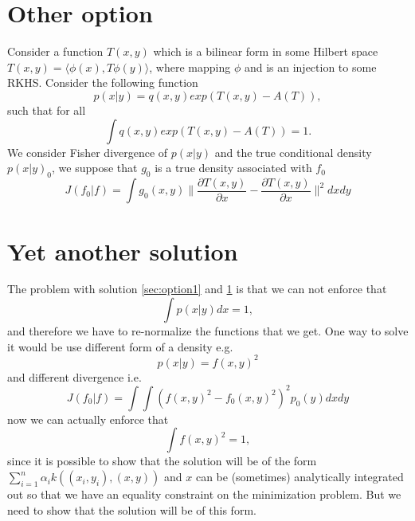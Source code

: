 \documentclass[10pt]{article}
\begin{document}
\section{Other option}
\label{sec:option2}
Consider a function $T(x,y)$ which is a bilinear form in some Hilbert space  $T(x,y) = \langle \phi(x), T \phi(y) \rangle $, where mapping $\phi$ and is an injection to some RKHS. Consider the following function
\begin{equation}
p(x|y) = q(x,y)exp(T(x,y) - A(T)),
\end{equation}
such that for all 
\begin{equation}
\label{eq:toOne}
 \int q(x,y)exp(T(x,y) - A(T)) = 1. 
\end{equation}
We consider Fisher divergence of $p(x|y)$ and the true conditional density $p(x|y)_0$, we suppose that $g_0$ is a true density associated with $f_0$ 
\begin{equation}
J(f_0|f) = \int g_0(x,y) \parallel \frac{\partial T(x,y)} {\partial x} -\frac{\partial T(x,y)} {\partial x} \parallel^2 dx dy  
\end{equation}

\section{Yet another solution}
The problem with solution \ref{sec:option1} and \ref{sec:option2} is that we can not enforce that 
\begin{equation}
 \int p(x|y) dx = 1,
\end{equation}
and therefore we have to re-normalize the functions that we get. One way to solve it would be use different form of a density e.g.
\begin{equation}
 p(x|y) = f(x,y)^2
\end{equation}
and different divergence i.e.
\begin{equation}
 J(f_0|f) = \int \int (f(x,y)^2 - f_0(x,y)^2)^2 p_0(y) dx dy 
\end{equation}
now we can actually enforce that 
\begin{equation}
\int f(x,y)^2 =1,  
\end{equation}
since it is possible to show that the solution will be of the  form $\sum_{i=1}^n \alpha_i k((x_i,y_i),(x,y))$ and $x$ can be (sometimes) analytically integrated out so that we have an equality  constraint on the minimization problem. But we need to show that the solution will be of this form.
\end{document}
